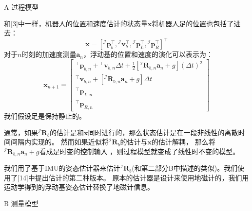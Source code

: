 A 过程模型

和[3]中一样，机器人的位置和速度估计的状态量$\boldsymbol{x}$将机器人足的位置也包括了进去：
\begin{equation}
    \label{equ:est_posvel}
    \boldsymbol{x}=\left[{ }^\mathcal{I} \boldsymbol{p}_b^{\top},{ }^\mathcal{I} \boldsymbol{v}_b^{\top},{ }^\mathcal{I} \boldsymbol{p}_L^{\top},{ }^\mathcal{I} \boldsymbol{p}_R^{\top}\right]^{\top}
\end{equation}
对于$n$时刻的加速度测量$\boldsymbol{a}_n$，浮动基的位置和速度的演化可以表示为：
\begin{equation}
    \label{equ:est_posvel}
    \boldsymbol{x}_{n+1}=\left[\begin{array}{c}
        { }^{\top} \boldsymbol{p}_{b, n}+{ }^{\top} \boldsymbol{v}_{b, n} \Delta t+\frac{1}{2}\left[{ }^{\mathcal{I}} \boldsymbol{R}_{b, n} \boldsymbol{a}_n+g\right](\Delta t)^2 \\
        { }^{\top} \boldsymbol{v}_{b, n}+\left[{ }^{\mathcal{I}} \boldsymbol{R}_{b, n} \boldsymbol{a}_n+g\right] \Delta t \\
        { }^{\top} \boldsymbol{p}_{L, n} \\
        { }^{\top} \boldsymbol{p}_{R, n}
        \end{array}\right]
\end{equation}
我们假设足是保持静止的。

通常，如果${ }^{\mathcal{I}} \boldsymbol{R}_{b}$的估计是和$\boldsymbol{x}$同时进行的，那么状态估计是在一段非线性的离散时间间隔内实现的。
然而如果近似将${ }^{\mathcal{I}} \boldsymbol{R}_{b}$的估计与$\boldsymbol{x}$的估计解耦，
那么将${ }^{\mathcal{I}} \boldsymbol{R}_{b, n} \boldsymbol{a}_n+g$看成是时变的控制输入 ，则过程模型就变成了线性时不变的模型。

我们用了基于IMU的姿态估计器来估计${ }^{\mathcal{I}} \boldsymbol{R}_{b}$(和第二部分B中描述的类似)。我们使用了[14]中提出估计的第二种版本。
原本的估计器是设计来使用地磁计的，我们用运动学得到的浮动基姿态估计替换了地磁计信息。

B 测量模型

